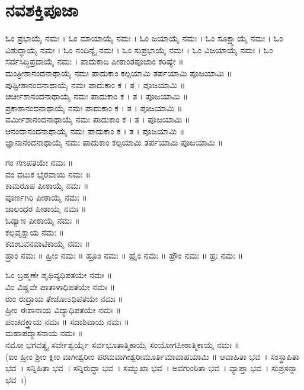 \section{ನವಶಕ್ತಿಪೂಜಾ}
ಓಂ ಪ್ರಭಾಯೈ ನಮಃ । ಓಂ  ಮಾಯಾಯೈ ನಮಃ । ಓಂ  ಜಯಾಯೈ ನಮಃ । ಓಂ  ಸೂಕ್ಷ್ಮಾಯೈ ನಮಃ । ಓಂ  ವಿಶುದ್ಧಾಯೈ ನಮಃ । ಓಂ  ನಂದಿನ್ಯೈ ನಮಃ । ಓಂ  ಸುಪ್ರಭಾಯೈ ನಮಃ । ಓಂ  ವಿಜಯಾಯೈ ನಮಃ । ಓಂ  ಸರ್ವಸಿದ್ಧಿಪ್ರದಾಯೈ ನಮಃ ।
\newpage
ಪಾದುಕಾದಿ ಪೀಠಾಂತಪೂಜಾಂ ಕರಿಷ್ಯೇ ॥\\
ಮಂತ್ರೀಶಾನಂದನಾಥಾಯೈ ನಮಃ ಪಾದುಕಾಂ ಕಲ್ಪಯಾಮಿ ತರ್ಪಯಾಮಿ ಪೂಜಯಾಮಿ ॥\\
ಪುಷ್ಟೀಶಾನಂದನಾಥಾಯೈ ನಮಃ ಪಾದುಕಾಂ ಕ । ತ । ಪೂಜಯಾಮಿ ॥\\
ಚರ್ಚೀಶಾನಂದನಾಥಾಯೈ ನಮಃ ಪಾದುಕಾಂ ಕ । ತ । ಪೂಜಯಾಮಿ ॥\\
ಪ್ರಕಾಶಾನಂದನಾಥಾಯೈ ನಮಃ ಪಾದುಕಾಂ ಕ । ತ । ಪೂಜಯಾಮಿ ॥\\
ವರ್ಮೀಶಾನಂದನಾಥಾಯೈ ನಮಃ ಪಾದುಕಾಂ ಕ । ತ । ಪೂಜಯಾಮಿ ॥\\
ಆನಂದಾನಂದನಾಥಾಯೈ ನಮಃ ಪಾದುಕಾಂ ಕ । ತ । ಪೂಜಯಾಮಿ ॥\\
ಜ್ಞಾನಾನಂದನಾಥಾಯೈ ನಮಃ ಪಾದುಕಾಂ ಕಲ್ಪಯಾಮಿ ತರ್ಪಯಾಮಿ ಪೂಜಯಾಮಿ ॥

ಗಂ ಗಣಪತಯೇ  ನಮಃ ॥\\
ವಂ ವಟುಕ ಭೈರವಾಯ ನಮಃ ॥\\
ಕಾಮರೂಪ ಪೀಠಾಯೈ ನಮಃ ॥\\
ಪೂರ್ಣಗಿರಿ ಪೀಠಾಯೈ ನಮಃ ॥\\
ಜಾಲಂಧರ ಪೀಠಾಯೈ ನಮಃ ॥\\
ಓಡ್ಯಾಣ ಪೀಠಾಯೈ ನಮಃ ॥\\
ಕಲ್ಪವೃಕ್ಷಾಯ ನಮಃ ॥\\
ಕದಂಬವನವಾಟಿಕಾಯೈ ನಮಃ ॥\\
ಹ್ರಾಂ ನಮಃ ॥
ಹ್ರೀಂ ನಮಃ ॥
ಹ್ರೂಂ ನಮಃ ॥
ಹ್ರೈಂ ನಮಃ ॥
ಹ್ರೌಂ ನಮಃ ॥
ಹ್ರಃ ನಮಃ ॥

ಓಂ ಬ್ರಹ್ಮಣೇ ಪೃಥಿವ್ಯಧಿಪತಯೇ ನಮಃ ॥\\
ವಿಂ ವಿಷ್ಣವೇ ಪಾತಾಳಾಧಿಪತಯೇ ನಮಃ ॥\\
ರುಂ ರುದ್ರಾಯ ತೇಜೋಽಧಿಪತಯೇ ನಮಃ ॥\\
ಹ್ರೀಂ ಈಶಾನಾಯ ವಿದ್ಯಾಧಿಪತಯೇ ನಮಃ ॥\\
ಪಂಚವಕ್ತ್ರಾಯ ನಮಃ ॥
ಸದಾಶಿವಾಯ ನಮಃ ॥\\
ಮಹಾಪದ್ಮಾಸನಾಯ ನಮಃ ॥\\
ನಮೋ ಭಗವತ್ಯೈ ಸರ್ವೇಶ್ವರ್ಯೈ ಸರ್ವಭೂತಾತ್ಮಿಕಾಯೈ ಸಂಯೋಗಪೀಠಾತ್ಮಿಕಾಯೈ ನಮಃ ॥\\
(ಐಂ ಹ್ರೀಂ ಶ್ರೀಂ ಕ್ಲೀಂ ವಾಗೀಶ್ವರೀಂ  ಪರಮವಾಗೀಶ್ವರೀಮೂರ್ತಿಮಾವಾಹಯಾಮಿ ॥ ಆವಾಹಿತಾ ಭವ~। ಸಂಸ್ಥಾಪಿತಾ ಭವ~। ಸನ್ನಿಹಿತಾ ಭವ~। ಸನ್ನಿರುದ್ಧಾ ಭವ~। ಸಮ್ಮುಖಾ ಭವ~। ಅವಗುಂಠಿತಾ ಭವ~। ವ್ಯಾಪ್ತಾ ಭವ~। ಸುಪ್ರಸನ್ನಾ ಭವ~।)

